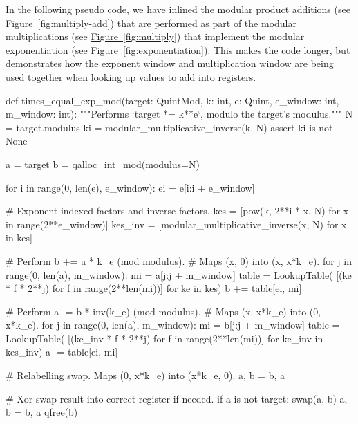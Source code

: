 \documentclass[onecolumn,unpublished]{quantumarticle}
\theoremstyle{definition}
\theoremstyle{definition}
\theoremstyle{definition}
\newcommand{\fig}[1]{\hyperref[fig:#1]{Figure~\ref*{fig:#1}}}
\begin{document}
In the following pseudo code, we have inlined the modular product additions (see \fig{multiply-add}) that are performed as part of the modular multiplications (see \fig{multiply}) that implement the modular exponentiation (see \fig{exponentiation}).
This makes the code longer, but demonstrates how the exponent window and multiplication window are being used together when looking up values to add into registers.

\begin{python}
    def times_equal_exp_mod(target: QuintMod,
                            k: int,
                            e: Quint,
                            e_window: int,
                            m_window: int):
        """Performs `target *= k**e`, modulo the target's modulus."""
        N = target.modulus
        ki = modular_multiplicative_inverse(k, N)
        assert ki is not None
    
        a = target
        b = qalloc_int_mod(modulus=N)
    
        for i in range(0, len(e), e_window):
            ei = e[i:i + e_window]
    
            # Exponent-indexed factors and inverse factors.
            kes = [pow(k, 2**i * x, N)
                   for x in range(2**e_window)]
            kes_inv = [modular_multiplicative_inverse(x, N)
                       for x in kes]
    
            # Perform b += a * k_e (mod modulus).
            # Maps (x, 0) into (x, x*k_e).
            for j in range(0, len(a), m_window):
                mi = a[j:j + m_window]
                table = LookupTable(
                    [(ke * f * 2**j) %
                     for f in range(2**len(mi))]
                    for ke in kes)
                b += table[ei, mi]
    
            # Perform a -= b * inv(k_e) (mod modulus).
            # Maps (x, x*k_e) into (0, x*k_e).
            for j in range(0, len(a), m_window):
                mi = b[j:j + m_window]
                table = LookupTable(
                    [(ke_inv * f * 2**j) %
                     for f in range(2**len(mi))]
                    for ke_inv in kes_inv)
                a -= table[ei, mi]
    
            # Relabelling swap. Maps (0, x*k_e) into (x*k_e, 0).
            a, b = b, a
    
        # Xor swap result into correct register if needed.
        if a is not target:
            swap(a, b)
            a, b = b, a
        qfree(b)
\end{python}
\end{document}
